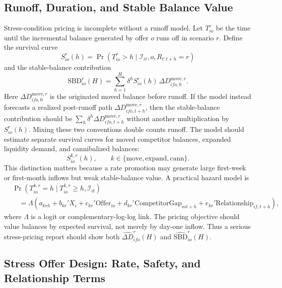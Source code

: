 \documentclass[11pt]{article}
\begin{document}
\subsection{Runoff, Duration, and Stable Balance Value}

Stress-condition pricing is incomplete without a runoff model. Let
$T_{io}^{r}$ be the time until the incremental balance generated by offer $o$
runs off in scenario $r$. Define the survival curve
\[
  S_{io}^{r}(h)
  =
  \Pr(T_{io}^{r}>h\mid
  \mathcal{I}_{it},o,R_{t:t+h}=r)
\]
and the stable-balance contribution
\[
  \mathrm{SBD}_{io}^{r}(H)
  =
  \sum_{h=1}^{H}\delta^h
  S_{io}^{r}(h)\,
  \Delta D_{ifo,0}^{\mathrm{move},r}.
\]
Here $\Delta D_{ifo,0}^{\mathrm{move},r}$ is the originated moved balance
before runoff. If the model instead forecasts a realized post-runoff path
$\Delta D_{ifo,t+h}^{\mathrm{move},r}$, then the stable-balance contribution
should be $\sum_h\delta^h\Delta D_{ifo,t+h}^{\mathrm{move},r}$ without another
multiplication by $S_{io}^{r}(h)$. Mixing these two conventions double counts
runoff.
The model should estimate separate survival curves for moved competitor
balances, expanded liquidity demand, and cannibalized balances:
\[
  S_{io}^{k,r}(h),\qquad
  k\in\{\mathrm{move},\mathrm{expand},\mathrm{cann}\}.
\]
This distinction matters because a rate promotion may generate large first-week
or first-month inflows but weak stable-balance value. A practical hazard model
is
\[
\begin{aligned}
  &\Pr(T_{io}^{k,r}=h\mid T_{io}^{k,r}\ge h,\mathcal{I}_{it}) \\
  &\quad =
  \Lambda\!\left(
    a_{krh}
    +b_{kr}'X_i
    +c_{kr}'\mathrm{Offer}_{io}
    +d_{kr}'\mathrm{CompetitorGap}_{mt+h}
    +e_{kr}'\mathrm{Relationship}_{if,t+h}
  \right),
\end{aligned}
\]
where $\Lambda$ is a logit or complementary-log-log link. The pricing objective
should value balances by expected survival, not merely by day-one inflow.
Thus a serious stress-pricing report should show both
$\widehat{\Delta D}_{ifo}^{r}(H)$ and $\widehat{\mathrm{SBD}}_{io}^{r}(H)$.

\subsection{Stress Offer Design: Rate, Safety, and Relationship Terms}
\end{document}
